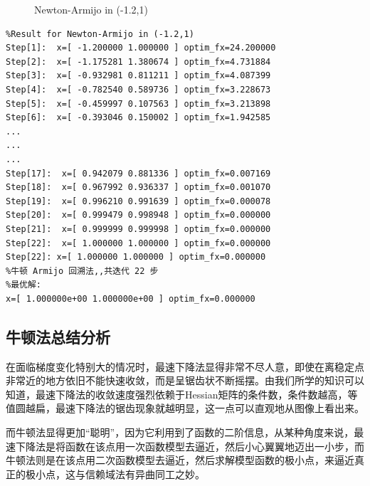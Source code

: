 \begin{figure}[H]
\caption{Newton-Armijo in (-1.2,1)}
\label{Fig.lable}
\end{figure}

\begin{lstlisting}
%Result for Newton-Armijo in (-1.2,1)
Step[1]:  x=[ -1.200000 1.000000 ] optim_fx=24.200000
Step[2]:  x=[ -1.175281 1.380674 ] optim_fx=4.731884
Step[3]:  x=[ -0.932981 0.811211 ] optim_fx=4.087399
Step[4]:  x=[ -0.782540 0.589736 ] optim_fx=3.228673
Step[5]:  x=[ -0.459997 0.107563 ] optim_fx=3.213898
Step[6]:  x=[ -0.393046 0.150002 ] optim_fx=1.942585
...
...
...
Step[17]:  x=[ 0.942079 0.881336 ] optim_fx=0.007169
Step[18]:  x=[ 0.967992 0.936337 ] optim_fx=0.001070
Step[19]:  x=[ 0.996210 0.991639 ] optim_fx=0.000078
Step[20]:  x=[ 0.999479 0.998948 ] optim_fx=0.000000
Step[21]:  x=[ 0.999999 0.999998 ] optim_fx=0.000000
Step[22]:  x=[ 1.000000 1.000000 ] optim_fx=0.000000
Step[22]: x=[ 1.000000 1.000000 ] optim_fx=0.000000
%牛顿 Armijo 回溯法,,共迭代 22 步
%最优解:
x=[ 1.000000e+00 1.000000e+00 ] optim_fx=0.000000
\end{lstlisting}

\newpage
\subsection{牛顿法总结分析}
在面临梯度变化特别大的情况时，最速下降法显得非常不尽人意，即使在离稳定点非常近的地方依旧不能快速收敛，而是呈锯齿状不断摇摆。由我们所学的知识可以知道，最速下降法的收敛速度强烈依赖于Hessian矩阵的条件数，条件数越高，等值圆越扁，最速下降法的锯齿现象就越明显，这一点可以直观地从图像上看出来。

而牛顿法显得更加“聪明”，因为它利用到了函数的二阶信息，从某种角度来说，最速下降法是将函数在该点用一次函数模型去逼近，然后小心翼翼地迈出一小步，而牛顿法则是在该点用二次函数模型去逼近，然后求解模型函数的极小点，来逼近真正的极小点，这与信赖域法有异曲同工之妙。

